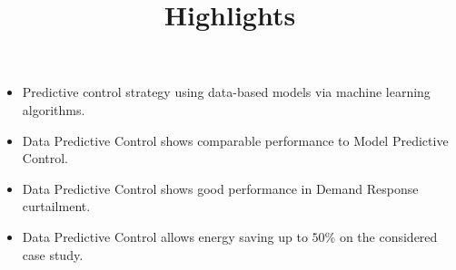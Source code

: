 \documentclass[12pt]{article}
\begin{document}
\title{Highlights}
\date{}
\maketitle 

\thispagestyle{empty}
\begin{itemize}
	\item Predictive control strategy using data-based models via machine learning algorithms.
	\item Data Predictive Control shows comparable performance to Model Predictive Control.
	\item Data Predictive Control shows good performance in Demand Response curtailment.
	\item Data Predictive Control allows energy saving up to $50\%$ on the considered case study.
\end{itemize}
\end{document}
